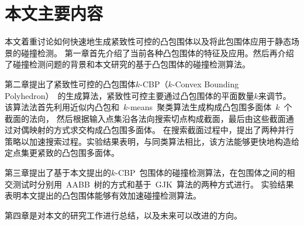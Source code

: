 \section{本文主要内容}
\label{sec:structure}
本文着重讨论如何快速地生成紧致性可控的凸包围体以及将此包围体应用于静态场景的碰撞检测。
第一章首先介绍了当前各种凸包围体的特征及应用。然后再介绍了碰撞检测问题的背景和本文研究的基于凸包围体的碰撞检测算法。

第二章提出了紧致性可控的凸包围体$k$-CBP（$k$-Convex Bounding Polyhedron）~的生成算法，紧致性可控主要通过凸包围体的平面数量$k$来调节。
该算法法首先利用近似内凸包和~$k$-means~聚类算法生成构成凸包围多面体~$k$~个截面的法向，
然后根据输入点集沿各法向搜索切点构成截面，最后由这些截面通过对偶映射的方式求交构成凸包围多面体。
在搜索截面过程中，提出了两种并行策略以加速搜索过程。实验结果表明，与同类算法相比，该方法能够更快地构造给定点集更紧致的凸包围多面体。

第三章提出了基于本文提出的$k$-CBP~包围体的碰撞检测算法，在包围体之间的相交测试时分别用~AABB~树的方式和基于~GJK~算法的两种方式进行。
实验结果表明本文提出的凸包围体能够有效加速碰撞检测算法。

第四章是对本文的研究工作进行总结，以及未来可以改进的方向。
